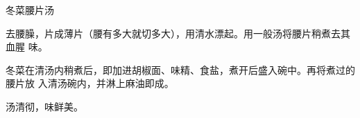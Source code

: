 %
%
%
%
%
%
%
\begin{recipe}{冬菜腰片汤}

\ingredients


\preparation

去腰臊，片成薄片（腰有多大就切多大），用清水漂起。用一般汤将腰片稍煮去其血腥
味。

冬菜在清汤内稍煮后，即加进胡椒面、味精、食盐，煮开后盛入碗中。再将煮过的腰片放
入清汤碗内，并淋上麻油即成。

\features

汤清彻，味鲜美。

\end{recipe}

